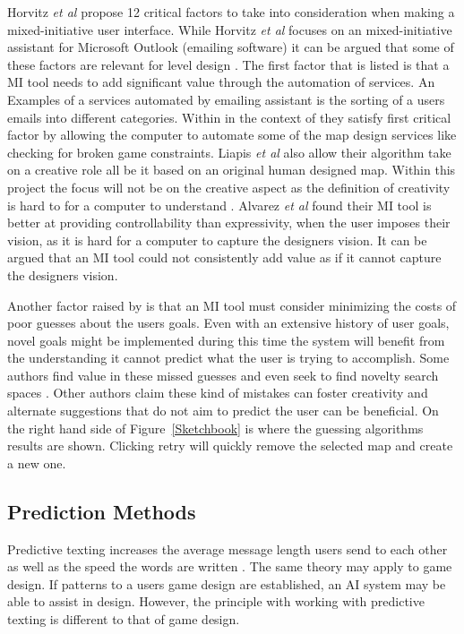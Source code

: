 \documentclass[journal]{IEEEtran}
\begin{document}
Horvitz \textit{et al} \cite{horvitz1999principles} propose 12 critical factors to take into consideration when making a mixed-initiative user interface. While Horvitz \textit{et al} \cite{horvitz1999principles}  focuses on an mixed-initiative assistant for Microsoft Outlook (emailing software) it can be argued that some of these factors are relevant for level design .  The first factor that is listed is that a MI tool needs to add significant value through the automation of services. An Examples of a services automated by emailing assistant is the sorting of a users emails into different categories.   Within in the context of \cite{liapis2013sentient}  they satisfy \cite{horvitz1999principles} first critical factor by allowing the computer to automate some of the map design services like checking for broken game constraints. Liapis \textit{et al} \cite{liapis2013sentient} also allow their algorithm take on a creative role all be it based on an original human designed map. Within this project the focus will not be on the creative aspect as the definition of creativity is hard to for a computer to understand \cite{jordanous2010defining}. Alvarez \textit{et al}\cite{alvarez2018fostering} found their MI tool is better at providing controllability than expressivity, when the user imposes their vision, as it is hard for a computer to capture the designers vision. It can be argued that an MI tool could not consistently add value as if it cannot capture the designers vision.

Another factor raised by \cite{horvitz1999principles} is that an MI tool must consider minimizing the costs of poor guesses about the users goals. Even with an extensive history of user goals, novel goals might be implemented during this time the system will benefit from the understanding it cannot predict what the user is trying to accomplish.  Some authors find value in these missed guesses and even seek to find novelty search spaces \cite{liapis2013sentient}. Other authors \cite{liapis2016can,alvarez2018fostering, yannakakis2014mixed} claim these kind of mistakes can foster creativity and alternate suggestions that do not aim to predict the user can be beneficial. On the right hand side of Figure~\ref{Sketchbook} is where the guessing algorithms results are shown. Clicking retry will quickly remove the selected map and create a new one. 




\subsection{Prediction Methods} \label{prediction}
Predictive texting increases the average message length users send to each other \cite{ling2005length} as well as the speed the words are written \cite{dunlop2000predictive}. The same theory may apply to game design. If patterns to a users game design are established, an AI system may be able to assist in design. However, the principle with working with predictive texting is different to that of game design.
\end{document}
